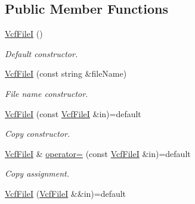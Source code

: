 \subsection*{Public Member Functions}
\begin{DoxyCompactItemize}
\item 
\mbox{\label{classvarfiles_1_1_vcf_file_i_aa4083a7d10a8cf9055f093af83f7dac4}} 
\hyperlink{classvarfiles_1_1_vcf_file_i_aa4083a7d10a8cf9055f093af83f7dac4}{Vcf\+FileI} ()
\begin{DoxyCompactList}\small\item\em Default constructor. \end{DoxyCompactList}\item 
\hyperlink{classvarfiles_1_1_vcf_file_i_ae6e3b117725eff5bd066b563cefdc787}{Vcf\+FileI} (const string \&file\+Name)
\begin{DoxyCompactList}\small\item\em File name constructor. \end{DoxyCompactList}\item 
\mbox{\label{classvarfiles_1_1_vcf_file_i_ad10f4acfd166b94077d50b52af045471}} 
\hyperlink{classvarfiles_1_1_vcf_file_i_ad10f4acfd166b94077d50b52af045471}{Vcf\+FileI} (const \hyperlink{classvarfiles_1_1_vcf_file_i}{Vcf\+FileI} \&in)=default
\begin{DoxyCompactList}\small\item\em Copy constructor. \end{DoxyCompactList}\item 
\mbox{\label{classvarfiles_1_1_vcf_file_i_a22bfba25a5f5b5cb8a2253e55c211772}} 
\hyperlink{classvarfiles_1_1_vcf_file_i}{Vcf\+FileI} \& \hyperlink{classvarfiles_1_1_vcf_file_i_a22bfba25a5f5b5cb8a2253e55c211772}{operator=} (const \hyperlink{classvarfiles_1_1_vcf_file_i}{Vcf\+FileI} \&in)=default
\begin{DoxyCompactList}\small\item\em Copy assignment. \end{DoxyCompactList}\item 
\mbox{\label{classvarfiles_1_1_vcf_file_i_abd14ad76dfd7178b8443355e5bcae640}} 
\hyperlink{classvarfiles_1_1_vcf_file_i_abd14ad76dfd7178b8443355e5bcae640}{Vcf\+FileI} (\hyperlink{classvarfiles_1_1_vcf_file_i}{Vcf\+FileI} \&\&in)=default

\end{DoxyCompactItemize}
